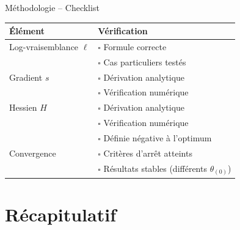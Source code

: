 \documentclass[11pt,aspectratio=169]{beamer}
\begin{document}
\begin{frame}{Méthodologie -- Checklist}

\begin{center}
    \small
    \renewcommand{\arraystretch}{1.3}
    \begin{tabular}{ll}
        \toprule
        \textbf{Élément} & \textbf{Vérification} \\
        \midrule
        Log-vraisemblance $\ell$ & $\square$ Formule correcte \\
        & $\square$ Cas particuliers testés \\
        \midrule
        Gradient $s$ & $\square$ Dérivation analytique \\
        & $\square$ Vérification numérique \\
        \midrule
        Hessien $H$ & $\square$ Dérivation analytique \\
        & $\square$ Vérification numérique \\
        & $\square$ Définie négative à l'optimum \\
        \midrule
        Convergence & $\square$ Critères d'arrêt atteints \\
        & $\square$ Résultats stables (différents $\theta_{(0)}$) \\
        \bottomrule
    \end{tabular}
\end{center}

\end{frame}

\section{Récapitulatif}
\end{document}
